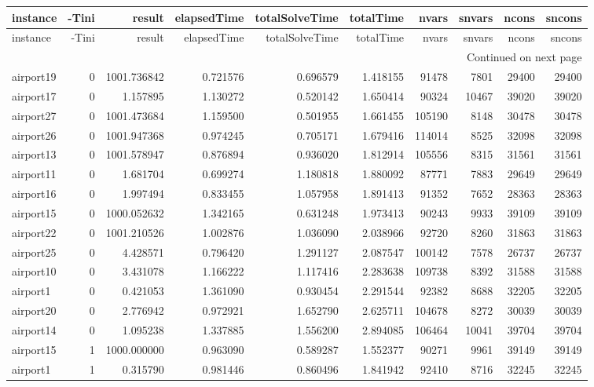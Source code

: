 
\begin{longtable}{|l|r|r|r|r|r|r|r|r|r|}
\toprule
instance & -Tini & result & elapsedTime & totalSolveTime & totalTime & nvars & snvars & ncons & sncons \\
\midrule
\endfirsthead
\toprule
instance & -Tini & result & elapsedTime & totalSolveTime & totalTime & nvars & snvars & ncons & sncons \\
\midrule
\endhead
\midrule
\multicolumn{10}{r}{Continued on next page} \\
\midrule
\endfoot
\bottomrule
\endlastfoot
airport19 & 0 & 1001.736842 & 0.721576 & 0.696579 & 1.418155 & 91478 & 7801 & 29400 & 29400 \\
airport17 & 0 & 1.157895 & 1.130272 & 0.520142 & 1.650414 & 90324 & 10467 & 39020 & 39020 \\
airport27 & 0 & 1001.473684 & 1.159500 & 0.501955 & 1.661455 & 105190 & 8148 & 30478 & 30478 \\
airport26 & 0 & 1001.947368 & 0.974245 & 0.705171 & 1.679416 & 114014 & 8525 & 32098 & 32098 \\
airport13 & 0 & 1001.578947 & 0.876894 & 0.936020 & 1.812914 & 105556 & 8315 & 31561 & 31561 \\
airport11 & 0 & 1.681704 & 0.699274 & 1.180818 & 1.880092 & 87771 & 7883 & 29649 & 29649 \\
airport16 & 0 & 1.997494 & 0.833455 & 1.057958 & 1.891413 & 91352 & 7652 & 28363 & 28363 \\
airport15 & 0 & 1000.052632 & 1.342165 & 0.631248 & 1.973413 & 90243 & 9933 & 39109 & 39109 \\
airport22 & 0 & 1001.210526 & 1.002876 & 1.036090 & 2.038966 & 92720 & 8260 & 31863 & 31863 \\
airport25 & 0 & 4.428571 & 0.796420 & 1.291127 & 2.087547 & 100142 & 7578 & 26737 & 26737 \\
airport10 & 0 & 3.431078 & 1.166222 & 1.117416 & 2.283638 & 109738 & 8392 & 31588 & 31588 \\
airport1 & 0 & 0.421053 & 1.361090 & 0.930454 & 2.291544 & 92382 & 8688 & 32205 & 32205 \\
airport20 & 0 & 2.776942 & 0.972921 & 1.652790 & 2.625711 & 104678 & 8272 & 30039 & 30039 \\
airport14 & 0 & 1.095238 & 1.337885 & 1.556200 & 2.894085 & 106464 & 10041 & 39704 & 39704 \\
airport15 & 1 & 1000.000000 & 0.963090 & 0.589287 & 1.552377 & 90271 & 9961 & 39149 & 39149 \\
airport1 & 1 & 0.315790 & 0.981446 & 0.860496 & 1.841942 & 92410 & 8716 & 32245 & 32245 \\

\end{longtable}
